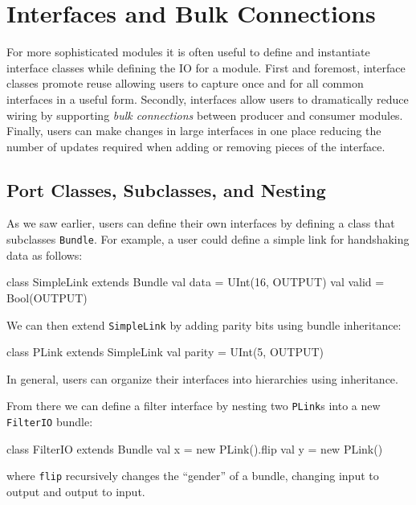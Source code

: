 \documentclass[twocolumn,10pt]{article}
\begin{document}
\section{Interfaces and Bulk Connections}
\label{sec:interfaces}

For more sophisticated modules it is often useful to define and
instantiate interface classes while defining the IO for a module.  First and
foremost, interface classes promote reuse allowing users to capture
once and for all common interfaces in a useful form.  Secondly,
interfaces allow users to dramatically reduce wiring by supporting
{\em bulk connections} between producer and consumer modules.  Finally,
users can make changes in large interfaces in one place reducing the
number of updates required when adding or removing pieces of the
interface.

\subsection{Port Classes, Subclasses, and Nesting}

As we saw earlier, users can define their own interfaces by defining a class that subclasses \verb+Bundle+.  
For example, a user could define a simple link for handshaking data as follows:

\begin{scala}
class SimpleLink extends Bundle { 
  val data  = UInt(16, OUTPUT) 
  val valid = Bool(OUTPUT)
}
\end{scala}

\noindent
We can then extend \verb+SimpleLink+ by adding parity bits using
bundle inheritance:

\begin{scala}
class PLink extends SimpleLink { 
  val parity = UInt(5, OUTPUT) 
}
\end{scala}

\noindent
In general, users can organize their interfaces into hierarchies using inheritance.  

From there we can define a filter interface by nesting two
\verb+PLink+s into a new \verb+FilterIO+ bundle:

\begin{scala}
class FilterIO extends Bundle { 
  val x = new PLink().flip
  val y = new PLink()
}
\end{scala}

\noindent
where \verb+flip+ recursively changes the ``gender'' of a bundle,
changing input to output and output to input.
\end{document}

